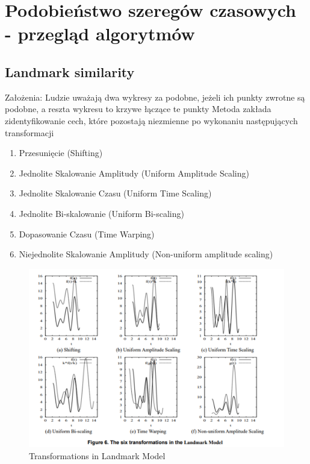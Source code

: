     \section{Podobieństwo szeregów czasowych - przegląd algorytmów}
    \label{theory:podobienstwo}
    
        \subsection{Landmark similarity}
            Założenia: Ludzie uważają dwa wykresy za podobne, jeżeli ich punkty zwrotne są podobne, a reszta wykresu to krzywe łączące te punkty
            \newline
            Metoda zakłada zidentyfikowanie cech, które pozostają niezmienne po wykonaniu następujących transformacji
            \begin{enumerate}
                \item Przesunięcie (Shifting) 
                \item Jednolite Skalowanie Amplitudy (Uniform Amplitude Scaling)
                \item Jednolite Skalowanie Czasu (Uniform Time Scaling)
                \item Jednolite Bi-skalowanie (Uniform Bi-scaling)
                \item Dopasowanie Czasu (Time Warping)
                \item Niejednolite Skalowanie Amplitudy (Non-uniform amplitude scaling)
            \end{enumerate}
            \begin{figure}[H]
                \centering
                \captionsetup{justification=centering,margin=0.5cm}
                \includegraphics[scale=0.4]{figures/03-teoria/theSixTransformationsInTheLandmarkModel.png}
                \caption{Transformations in Landmark Model}
                \label{fig:scr46}
            \end{figure}
